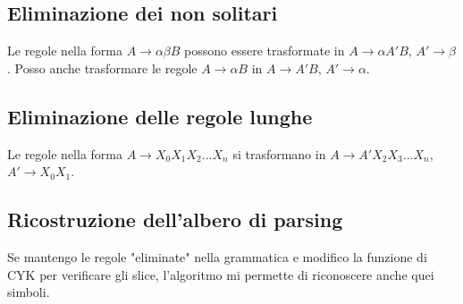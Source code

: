 \subsection{Eliminazione dei non solitari}

Le regole nella forma $A \rightarrow \alpha \beta B$ possono essere trasformate in $A \rightarrow \alpha A' B$, $A' \rightarrow \beta$.
Posso anche trasformare le regole $A \rightarrow \alpha B$ in $A \rightarrow A' B$, $A' \rightarrow \alpha$.

\subsection{Eliminazione delle regole lunghe}

Le regole nella forma $A \rightarrow X_0 X_1 X_2 ... X_n$ si trasformano in $A \rightarrow A' X_2 X_3 ... X_n$, $A' \rightarrow X_0 X_1$.

\subsection{Ricostruzione dell'albero di parsing}

Se mantengo le regole "eliminate" nella grammatica e modifico la funzione di CYK per verificare gli slice, l'algoritmo mi permette di riconoscere anche quei simboli.
